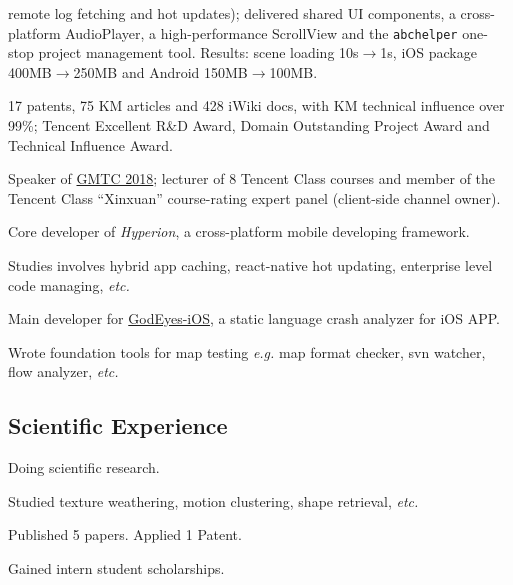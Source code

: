 {\begin{tightitemize}
    remote log fetching and hot updates);
    delivered shared UI components, a cross-platform AudioPlayer, a high-performance
    ScrollView and the \texttt{abchelper} one-stop project management tool.
    Results: scene loading 10s$\rightarrow$1s, iOS package 400MB$\rightarrow$250MB and
    Android 150MB$\rightarrow$100MB.
  \item 17 patents, 75 KM articles and 428 iWiki docs, with KM technical influence over 99\%; Tencent Excellent R\&D Award,
    Domain Outstanding Project Award and Technical Influence Award.
  \item Speaker of \href{https://www.infoq.cn/article/QXiWs69g24PMk0ldg1to}{GMTC 2018};
    lecturer of 8 Tencent Class courses and member of
    the Tencent Class ``Xinxuan'' course-rating expert panel (client-side channel owner).
  \end{tightitemize}}

{
\begin{tightitemize}%
 \item Core developer of \textsl{Hyperion}, a cross-platform mobile developing framework.
 \item Studies involves hybrid app caching, react-native hot updating, enterprise level code managing, \textsl{etc.}
 \end{tightitemize}}


{
\begin{tightitemize}%
 \item Main developer for \href{http://godeyes.duapp.com}{GodEyes-iOS}, a static
   language crash analyzer for iOS APP. 
 \item Wrote foundation tools for
   map testing \textsl{e.g.} map format checker, svn
   watcher, flow analyzer, \textsl{etc.}
 \end{tightitemize}}

\newpage

\subsection{Scientific Experience}

{Doing scientific research.
\begin{tightitemize}%
 \item Studied texture weathering, motion clustering, shape retrieval, \textsl{etc.}
 \item Published 5 papers. Applied 1 Patent.
 \item Gained intern student scholarships. 
 \end{tightitemize}}

